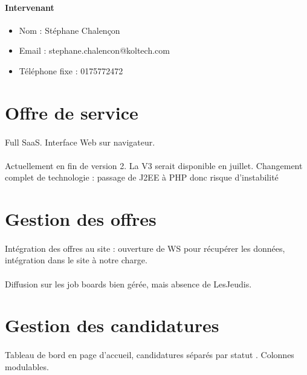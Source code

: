 \paragraph{Intervenant}
\begin{itemize}
	\item Nom : Stéphane Chalençon
	\item Email : stephane.chalencon@koltech.com
	\item Téléphone fixe : 0175772472  
\end{itemize}

\section{Offre de service}
\paragraph{} Full SaaS. Interface Web sur navigateur.
\paragraph{} Actuellement en fin de version 2. La V3 serait disponible en juillet. Changement complet de technologie : passage de J2EE à PHP donc risque d'instabilité


\section{Gestion des offres}

\paragraph{} Intégration des offres au site : ouverture de WS pour récupérer les données, intégration dans le site à notre charge.
\paragraph{} Diffusion sur les job boards bien gérée, mais absence de LesJeudis.

\section{Gestion des candidatures}
\paragraph{} Tableau de bord en page d'accueil, candidatures séparés par statut . Colonnes modulables.
